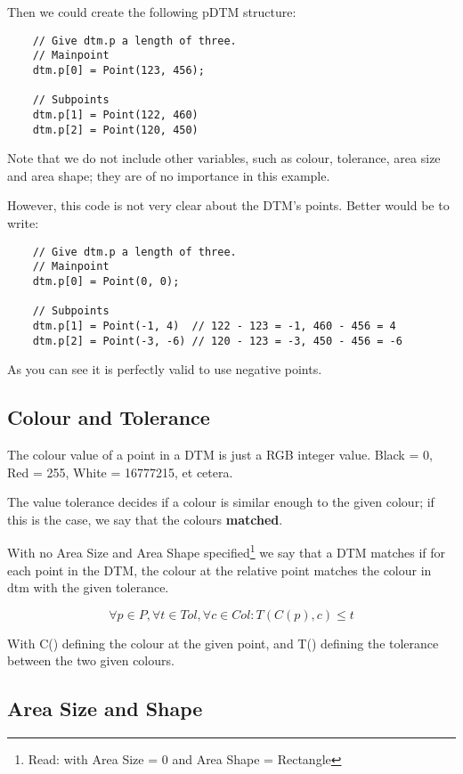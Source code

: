 \documentclass[a4paper, 10pt]{report} %
\begin{document}
Then we could create the following pDTM structure:

\begin{verbatim}
	// Give dtm.p a length of three.
	// Mainpoint
	dtm.p[0] = Point(123, 456);

	// Subpoints
	dtm.p[1] = Point(122, 460)
	dtm.p[2] = Point(120, 450)
\end{verbatim}

Note that we do not include other variables, such as colour, tolerance, area
size and area shape; they are of no importance in this example.

However, this code is not very clear about the DTM's points.
Better would be to write:

\begin{verbatim}
    // Give dtm.p a length of three.
    // Mainpoint
    dtm.p[0] = Point(0, 0);

    // Subpoints
    dtm.p[1] = Point(-1, 4)  // 122 - 123 = -1, 460 - 456 = 4
    dtm.p[2] = Point(-3, -6) // 120 - 123 = -3, 450 - 456 = -6
\end{verbatim}

As you can see it is perfectly valid to use negative points.

\subsection{Colour and Tolerance}

The colour value of a point in a DTM is just a RGB integer value.
Black = 0, Red = 255, White = 16777215, et cetera.

The value tolerance decides if a colour is similar enough to the given
colour; if this is the case, we say that the colours \textbf{matched}.

With no Area Size and Area Shape specified\footnote{Read: with Area
Size = 0 and Area Shape = Rectangle} we say that a DTM matches if for each
point in the DTM, the colour at the relative point matches the colour in dtm
with the given tolerance.

$$ \forall p \in P, \forall t \in Tol, \forall c \in Col : T(C(p), c) \leq t $$

With C() defining the colour at the given point, and T() defining the tolerance
between the two given colours.

\subsection{Area Size and Shape}
\end{document}
